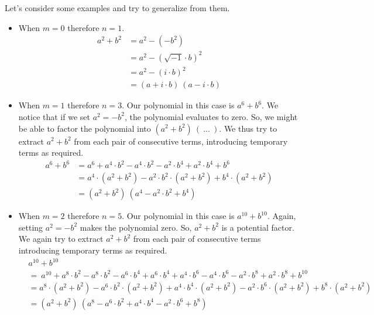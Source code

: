 \documentclass[12pt]{article}
\begin{document}
Let's consider some examples and try to generalize from them.
\begin{itemize}
\item When $m=0$ therefore $n=1$.
\begin{equation*}
	\begin{aligned}
		a^2+b^2 &= a^2 - \left( -b^2 \right)\\
				&= a^2 - \left( \sqrt{-1}\cdot b \right)^2\\
				&= a^2 - (i\cdot b)^2\\
				&= (a+i\cdot b)\ (a-i\cdot b)
	\end{aligned}
\end{equation*}

\item When $m=1$ therefore $n=3$.
Our polynomial in this case is $a^{6}+b^{6}$. We notice that if we set $a^2 = -b^2$, the polynomial evaluates to zero. So, we might be able to factor the polynomial into $\left(a^2+b^2\right)\ (\ \ldots\ )$. We thus try to extract $a^2+b^2$ from each pair of consecutive terms, introducing temporary terms as required.
\begin{equation*}
	\begin{aligned}
		a^6+b^6 &= a^6 + a^4\cdot b^2 - a^4\cdot b^2 - a^2\cdot b^4 + a^2\cdot b^4 + b^6\\
				&= a^4\cdot \left( a^2+b^2 \right) - a^2\cdot b^2\cdot \left( a^2+b^2 \right) + b^4\cdot \left( a^2+b^2 \right)\\
				&= \left( a^2+b^2 \right)\ \left( a^4-a^2\cdot b^2+b^4 \right)
	\end{aligned}
\end{equation*}
\item When $m=2$ therefore $n=5$.
Our polynomial in this case is $a^{10}+b^{10}$. Again, setting $a^2=-b^2$ makes the polynomial zero. So, $a^2+b^2$ is a potential factor. We again try to extract $a^2+b^2$ from each pair of consecutive terms introducing temporary terms as required.
\begin{equation*}
	\begin{aligned}
		& a^{10} + b^{10}\\
		&=\ a^{10} + a^8\cdot b^2 - a^8\cdot b^2 - a^6\cdot b^4 + a^6\cdot b^4 + a^4\cdot b^6 - a^4\cdot b^6 - a^2\cdot b^8 + a^2\cdot b^8 + b^{10}\\
		&= a^8 \cdot \left( a^2+b^2 \right) - a^6\cdot b^2\cdot \left( a^2+b^2\right) + a^4\cdot b^4\cdot \left( a^2+b^2 \right) - a^2\cdot b^6\cdot \left( a^2+b^2 \right) + b^8\cdot \left( a^2+b^2 \right)\\
		&= \left( a^2+b^2 \right)\ \left( a^8 - a^6\cdot b^2 + a^4\cdot b^4 - a^2\cdot b^6 + b^8 \right)
	\end{aligned}
\end{equation*}
\end{itemize}
\end{document}
